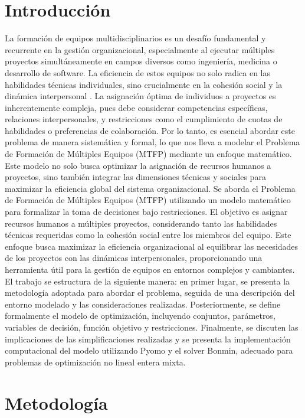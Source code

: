 \documentclass[conference]{IEEEtran}
\begin{document}
\section{Introducción}
La formación de equipos multidisciplinarios es un desafío fundamental y recurrente en la gestión organizacional, especialmente al ejecutar múltiples proyectos simultáneamente en campos diversos como ingeniería, medicina o desarrollo de software. La eficiencia de estos equipos no solo radica en las habilidades técnicas individuales, sino crucialmente en la cohesión social y la dinámica interpersonal \cite{gutierrez2016multiple}. La asignación óptima de individuos a proyectos es inherentemente compleja, pues debe considerar competencias específicas, relaciones interpersonales, y restricciones como el cumplimiento de cuotas de habilidades o preferencias de colaboración.
Por lo tanto, es esencial abordar este problema de manera sistemática y formal, lo que nos lleva a modelar el Problema de Formación de Múltiples Equipos (MTFP) mediante un enfoque matemático. Este modelo no solo busca optimizar la asignación de recursos humanos a proyectos, sino también integrar las dimensiones técnicas y sociales para maximizar la eficiencia global del sistema organizacional.
Se aborda el Problema de Formación de Múltiples Equipos (MTFP) utilizando un modelo matemático para formalizar la toma de decisiones bajo restricciones.
El objetivo es asignar recursos humanos a múltiples proyectos, considerando tanto las habilidades técnicas requeridas como la cohesión social entre los miembros del equipo. Este enfoque busca maximizar la eficiencia organizacional al equilibrar las necesidades de los proyectos con las dinámicas interpersonales, proporcionando una herramienta útil para la gestión de equipos en entornos complejos y cambiantes.
El trabajo se estructura de la siguiente manera: en primer lugar, se presenta la metodología adoptada para abordar el problema, seguida de una descripción del entorno modelado y las consideraciones realizadas. Posteriormente, se define formalmente el modelo de optimización, incluyendo conjuntos, parámetros, variables de decisión, función objetivo y restricciones. Finalmente, se discuten las implicaciones de las simplificaciones realizadas y se presenta la implementación computacional del modelo utilizando Pyomo y el solver Bonmin, adecuado para problemas de optimización no lineal entera mixta.

\section{Metodología}
\end{document}
